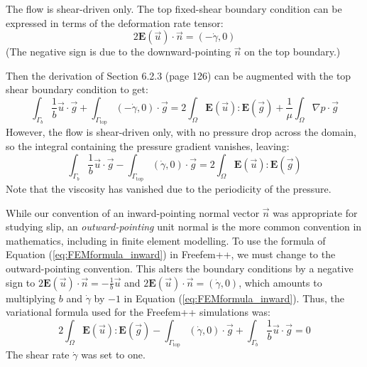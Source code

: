\documentclass[12pt, a4paper, twoside, openright]{book}
\begin{document}
The flow is shear-driven only.  The top fixed-shear boundary condition can be expressed in terms of the deformation rate tensor:
\begin{equation}
 2 \mathbf{E}(\vec{u}) \cdot \vec{n} = (- \dot{\gamma}, 0)
\end{equation}
(The negative sign is due to the downward-pointing $\vec{n}$ on the top boundary.)

Then the derivation of Section 6.2.3 (page 126) can be augmented with the top shear boundary condition to get:
\begin{equation}
\int_{\Gamma_b} \frac{1}{b} \vec{u} \cdot \vec{g} +
\int_{\Gamma_{\mathrm{top}}} (-\dot{\gamma},0) \cdot \vec{g} = 
2 \int_{\Omega} \mathbf{E}(\vec{u}) : \mathbf{E}(\vec{g}) +
\frac{1}{\mu} \int_{\Omega}  \nabla p \cdot \vec{g}
\end{equation}
However, the flow is shear-driven only, with no pressure drop across the domain, so the integral containing the pressure gradient vanishes, leaving:
\begin{equation}
\int_{\Gamma_b} \frac{1}{b} \vec{u} \cdot \vec{g} -
\int_{\Gamma_{\mathrm{top}}} (\dot{\gamma},0) \cdot \vec{g} = 
2 \int_{\Omega} \mathbf{E}(\vec{u}) : \mathbf{E}(\vec{g})
\label{eq:FEMformula_inward}
\end{equation}
Note that the viscosity has vanished due to the periodicity of the pressure.

While our convention of an inward-pointing normal vector $\vec{n}$ was appropriate for studying slip, an \emph{outward-pointing} unit normal is the more common convention in mathematics, including in finite element modelling.  To use the formula of Equation (\ref{eq:FEMformula_inward}) in Freefem++, we must change to the outward-pointing convention. This alters the boundary conditions by a negative sign to $ 2 \mathbf{E}(\vec{u}) \cdot \vec{n} = -\frac{1}{b} \vec{u} $ and $2 \mathbf{E}(\vec{u}) \cdot \vec{n} = (\dot{\gamma}, 0) $, which amounts to multiplying $b$ and $\dot{\gamma}$ by $-1$ in Equation (\ref{eq:FEMformula_inward}).  Thus, the variational formula used for the Freefem++ simulations was:
\begin{equation}
2 \int_{\Omega} \mathbf{E}(\vec{u}) : \mathbf{E}(\vec{g}) -
\int_{\Gamma_{\mathrm{top}}} (\dot{\gamma},0) \cdot \vec{g} +
\int_{\Gamma_b} \frac{1}{b} \vec{u} \cdot \vec{g} = 0
\end{equation}
The shear rate $\dot{\gamma}$ was set to one.
\end{document}

